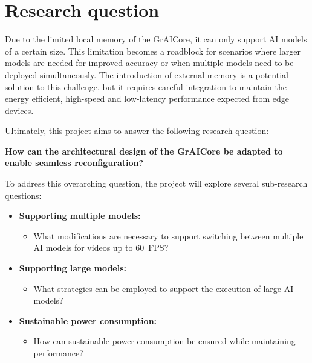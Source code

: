 \section{Research question}

Due to the limited local memory of the GrAICore, it can only support AI models of a certain size.
This limitation becomes a roadblock for scenarios where larger models are needed for improved accuracy or when multiple models need to be deployed simultaneously.
The introduction of external memory is a potential solution to this challenge, but it requires careful integration to maintain the energy efficient, high-speed and low-latency performance expected from edge devices.

Ultimately, this project aims to answer the following research question:

\textbf{How can the architectural design of the GrAICore be adapted to enable seamless reconfiguration?}

To address this overarching question, the project will explore several sub-research questions:

\begin{itemize}
    \item \textbf{Supporting multiple models:}
    \begin{itemize}
        \item What modifications are necessary to support switching between multiple AI models for videos up to \SI{60}{FPS}?
    \end{itemize}
    \item \textbf{Supporting large models:}
    \begin{itemize}
        \item What strategies can be employed to support the execution of large AI models?
    \end{itemize}
    \item \textbf{Sustainable power consumption:}
    \begin{itemize}
        \item How can sustainable power consumption be ensured while maintaining performance?
    \end{itemize}
\end{itemize}